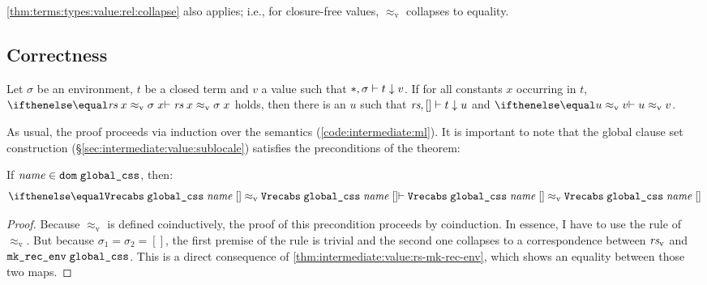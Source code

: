 \noindent
\cref{thm:terms:types:value:rel:collapse} also applies; i.e., for closure-free values, $\approx_\text{v}$ collapses to equality.

\subsection{Correctness}

\begin{theorem}
  \label{thm:intermediate:ml}
  Let $\sigma$ be an environment, $t$ be a closed term and $v$ a value such that $*, \sigma \vdash t \downarrow v$.
  If for all constants $x$ occurring in $t$, $\corrv{\rs\;x}{\sigma\;x}$ holds, then there is an $u$ such that $\textit{rs}, [] \vdash t \downarrow u$ and $\corrv{u}{v}$.
\end{theorem}

\noindent As usual, the proof proceeds via induction over the semantics (\cref{code:intermediate:ml}).
It is important to note that the global clause set construction (§\ref{sec:intermediate:value:sublocale}) satisfies the preconditions of the theorem:

\begin{lemma}
  If $\mathit{name} \in \texttt{\textup{dom}}\;\texttt{\textup{global\_css}}$, then:
  \[
    \corrv{\holconst{Vrecabs}\;\holconst{global\_css}\;\mathit{name}\;[]}{\holconst{Vrecabs}\;\holconst{global\_css}\;\mathit{name}\;[]}
  \]
\end{lemma}

\begin{proof}
  Because $\approx_\text{v}$ is defined coinductively, the proof of this precondition proceeds by coinduction.
  In essence, I have to use the  rule of $\approx_\text{v}$.
  But because $\sigma_1 = \sigma_2 = []$, the first premise of the rule is trivial and the second one collapses to a correspondence between $\textit{rs}_\text{v}$ and $\texttt{\textup{mk\_rec\_env}}\;\texttt{\textup{global\_css}}$.
  This is a direct consequence of \cref{thm:intermediate:value:rs-mk-rec-env}, which shows an equality between those two maps.
\end{proof}